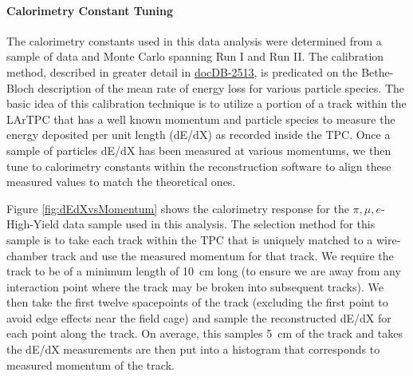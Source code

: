 \paragraph{\textbf{Calorimetry Constant Tuning}}
The calorimetry constants used in this data analysis were determined from a sample of data and Monte Carlo spanning Run I and Run II. The calibration method, described in greater detail in \href{https://lartpc-docdb.fnal.gov:441/cgi-bin/ShowDocument?docid=2513}{docDB-2513}, is predicated on the Bethe-Bloch description of the mean rate of energy loss for various particle species. The basic idea of this calibration technique is to utilize a portion of a track within the LArTPC that has a well known momentum and particle species to measure the energy deposited per unit length (dE/dX) as recorded inside the TPC. Once a sample of particles dE/dX has been measured at various momentums, we then tune to calorimetry constants within the reconstruction software to align these measured values to match the theoretical ones.

Figure \ref{fig:dEdXvsMomentum} shows the calorimetry response for the $\pi, \mu, e$-High-Yield data sample used in this analysis. The selection method for this sample is to take each  track within the TPC that is uniquely matched to a wire-chamber track and use the measured momentum for that track. We require the track to be of a minimum length of 10~cm long (to ensure we are away from any interaction point where the track may be broken into subsequent tracks). We then take the first twelve spacepoints of the track (excluding the first point to avoid edge effects near the field cage) and sample the reconstructed dE/dX for each point along the track. On average, this samples 5~cm of the track and takes the dE/dX measurements are then put into a histogram that corresponds to measured momentum of the track.

